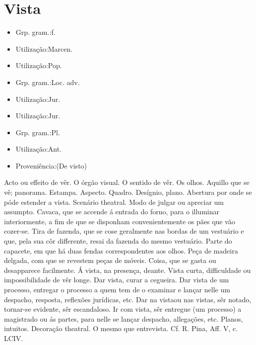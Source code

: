 \documentclass{article}
\begin{document}
\section{Vista}
\begin{itemize}
\item {Grp. gram.:f.}
\end{itemize}
\begin{itemize}
\item {Utilização:Marcen.}
\end{itemize}
\begin{itemize}
\item {Utilização:Pop.}
\end{itemize}
\begin{itemize}
\item {Grp. gram.:Loc. adv.}
\end{itemize}
\begin{itemize}
\item {Utilização:Jur.}
\end{itemize}
\begin{itemize}
\item {Utilização:Jur.}
\end{itemize}
\begin{itemize}
\item {Grp. gram.:Pl.}
\end{itemize}
\begin{itemize}
\item {Utilização:Ant.}
\end{itemize}
\begin{itemize}
\item {Proveniência:(De \textunderscore visto\textunderscore )}
\end{itemize}
Acto ou effeito de vêr.
O órgão visual.
O sentido de vêr.
Os olhos.
Aquillo que se vê; panorama.
Estampa.
Aspecto.
Quadro.
Desígnio, plano.
Abertura por onde se póde estender a vista.
Scenário theatral.
Modo de julgar ou apreciar um assumpto.
Cavaca, que se accende á entrada do forno, para o illuminar interiormente, a fim de que se disponham convenientemente os pães que vão cozer-se.
Tira de fazenda, que se cose geralmente nas bordas de um vestuário e que, pela sua côr differente, resai da fazenda do mesmo vestuário.
Parte do capacete, em que há duas fendas correspondentes aos olhos.
Peça de madeira delgada, com que se revestem peças de móveis.
Coisa, que se gasta ou desapparece facilmente.
\textunderscore Á vista\textunderscore , na presença, deante.
\textunderscore Vista curta\textunderscore , difficuldade ou impossibilidade de vêr longe.
\textunderscore Dar vista\textunderscore , curar a cegueira.
\textunderscore Dar vista de um processo\textunderscore , entregar o processo a quem tem de o examinar e lançar nelle um despacho, resposta, reflexões jurídicas, etc.
\textunderscore Dar na vista\textunderscore  ou \textunderscore nas vistas\textunderscore , sêr notado, tornar-se evidente, sêr escandaloso.
\textunderscore Ir com vista\textunderscore , sêr entregue (um processo) a magistrado ou ás partes, para nelle se lançar despacho, allegações, etc.
Planos, intuitos.
Decoração theatral.
O mesmo que \textunderscore entrevista\textunderscore . Cf. R. Pina, \textunderscore Aff. V\textunderscore , c. LCIV.
\end{document}
